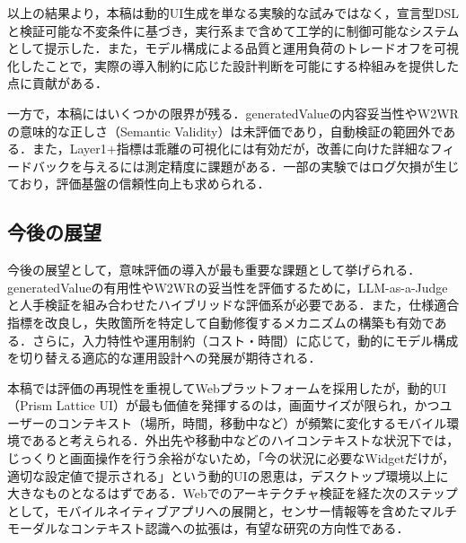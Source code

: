\documentclass[a4paper,10pt]{jarticle}
\begin{document}

以上の結果より，本稿は動的UI生成を単なる実験的な試みではなく，宣言型DSLと検証可能な不変条件に基づき，実行系まで含めて工学的に制御可能なシステムとして提示した．また，モデル構成による品質と運用負荷のトレードオフを可視化したことで，実際の導入制約に応じた設計判断を可能にする枠組みを提供した点に貢献がある．


一方で，本稿にはいくつかの限界が残る．generatedValueの内容妥当性やW2WRの意味的な正しさ（Semantic Validity）は未評価であり，自動検証の範囲外である．また，Layer1+指標は乖離の可視化には有効だが，改善に向けた詳細なフィードバックを与えるには測定精度に課題がある．一部の実験ではログ欠損が生じており，評価基盤の信頼性向上も求められる．


\subsection{今後の展望}
\label{subsec:conc_future}


今後の展望として，意味評価の導入が最も重要な課題として挙げられる．generatedValueの有用性やW2WRの妥当性を評価するために，LLM-as-a-Judgeと人手検証を組み合わせたハイブリッドな評価系が必要である．また，仕様適合指標を改良し，失敗箇所を特定して自動修復するメカニズムの構築も有効である．さらに，入力特性や運用制約（コスト・時間）に応じて，動的にモデル構成を切り替える適応的な運用設計への発展が期待される．


本稿では評価の再現性を重視してWebプラットフォームを採用したが，動的UI（Prism Lattice UI）が最も価値を発揮するのは，画面サイズが限られ，かつユーザーのコンテキスト（場所，時間，移動中など）が頻繁に変化するモバイル環境であると考えられる．外出先や移動中などのハイコンテキストな状況下では，じっくりと画面操作を行う余裕がないため，「今の状況に必要なWidgetだけが，適切な設定値で提示される」という動的UIの恩恵は，デスクトップ環境以上に大きなものとなるはずである．Webでのアーキテクチャ検証を経た次のステップとして，モバイルネイティブアプリへの展開と，センサー情報等を含めたマルチモーダルなコンテキスト認識への拡張は，有望な研究の方向性である．
\end{document}
